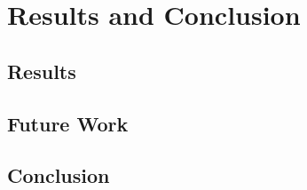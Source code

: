 \chapter[Results and Conclusion]{Results and Conclusion}

\section[Results]{Results}

\section[Future Work]{Future Work}

\section[Conclusion]{Conclusion}